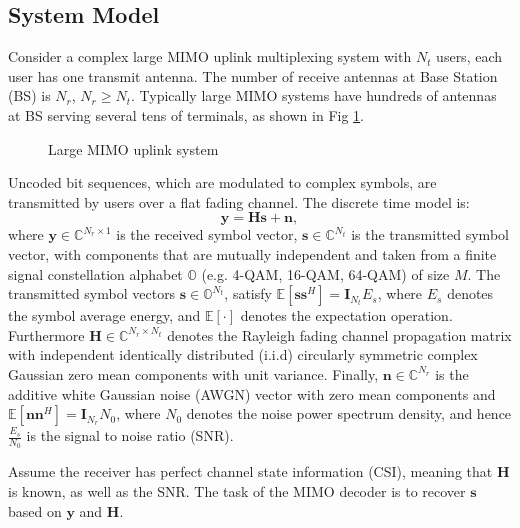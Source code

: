 \documentclass[12pt, draftclsnofoot, onecolumn]{IEEEtran}
\begin{document}
\begin{spacing}{2}
\section{System Model}\label{system model}
  Consider a complex large MIMO uplink multiplexing system with $N_{t}$ users, each user has one transmit antenna. The number of receive antennas at Base Station (BS) is $N_{r}$, $N_{r}\geq N_{t}$. Typically large MIMO systems have hundreds of antennas at BS serving several tens of terminals, as shown in Fig {\ref{large MIMO uplink model}}.
  \begin{figure}[htb]
  \centering
  \def\svgwidth{\columnwidth}
  
  \caption{Large MIMO uplink system }
  \label{large MIMO uplink model}
  \end{figure}
    
  Uncoded bit sequences, which are modulated to complex symbols, are transmitted by users over a flat fading channel. The discrete time model is:
\begin{equation}
\mathbf{y}=\mathbf{H}\mathbf{s}+\mathbf{n},   \label{discrete time MIMO system}
\end{equation}
where $\mathbf{y}\in\mathbb{C}^{N_{r}\times 1}$ is the received symbol vector, $\mathbf{s}\in \mathbb{C}^{N_{t}}$ is the transmitted symbol vector, with components that are mutually independent and taken from a finite signal constellation alphabet $\mathbb{O}$ (e.g. 4-QAM, 16-QAM, 64-QAM) of size $M$. The transmitted symbol vectors $\mathbf{s}\in \mathbb{O}^{N_{t}}$, satisfy $\mathbb{E}[\mathbf{s}\mathbf{s}^{H}]=\mathbf{I}_{N_t}E_{s}$, where $E_{s}$ denotes the symbol average energy, and $\mathbb{E}[\cdot]$ denotes the expectation operation. Furthermore $\mathbf{H}\in \mathbb{C}^{N_{r}\times N_{t}}$ denotes the Rayleigh fading channel propagation matrix with independent identically distributed (i.i.d) circularly symmetric complex Gaussian zero mean components with unit variance. Finally, $\mathbf{n}\in \mathbb{C}^{N_{r}}$ is the additive white Gaussian noise (AWGN) vector with zero mean components and $\mathbb{E}[\mathbf{n}\mathbf{n}^{H}]=\mathbf{I}_{N_{r}}N_{0}$, where $N_{0}$ denotes the noise power spectrum density, and hence $\frac{E_{s}}{N_{0}}$ is the signal to noise ratio (SNR). 

  Assume the receiver has perfect channel state information (CSI), meaning that $ \mathbf{H}$ is known, as well as the SNR. The task of the MIMO decoder is to recover $\mathbf{s}$ based on $\mathbf{y}$ and $\mathbf{H}$.


\end{spacing}
\end{document}
